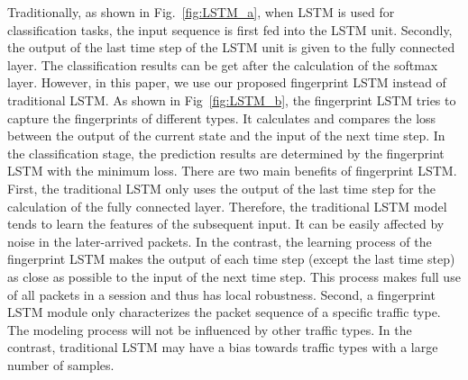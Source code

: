 Traditionally, as shown in Fig.~\ref{fig:LSTM_a},  when LSTM is used for classification tasks, the input sequence is first fed into the LSTM unit. 
Secondly, the output of the last time step of the LSTM unit is given to the fully connected layer.
The classification results can be get after the calculation of the softmax layer. 
However, in this paper, we use our proposed fingerprint LSTM instead of traditional LSTM. 
As shown in Fig~\ref{fig:LSTM_b}, the fingerprint LSTM tries to capture the fingerprints of different types. 
It calculates and compares the loss between the output of the current state and the input of the next time step. 
In the classification stage, the prediction results are determined by the fingerprint LSTM with the minimum loss.
There are two main benefits of fingerprint LSTM. 
First, the traditional LSTM only uses the output of the last time step for the calculation of the fully connected layer. 
Therefore, the traditional LSTM model tends to learn the features of the subsequent input. 
It can be easily affected by noise in the later-arrived packets. 
In the contrast, the learning process of the fingerprint LSTM makes the output of each time step (except the last time step) as close as possible to the input of the next time step. 
This process makes full use of all packets in a session and thus has local robustness. 
Second, a fingerprint LSTM module only characterizes the packet sequence of a specific traffic type. 
The modeling process will not be influenced by other traffic types. 
In the contrast, traditional LSTM may have a bias towards traffic types with a large number of samples.